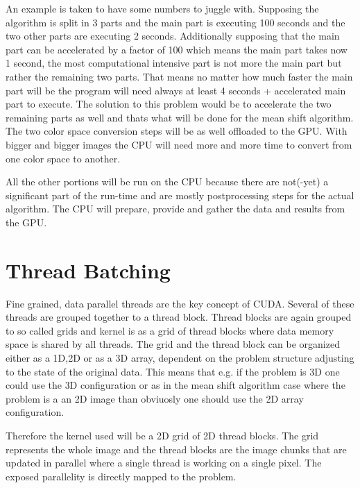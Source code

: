 An example is taken to have some numbers to juggle with. Supposing the algorithm
is split in 3 parts and the main part is executing 100 seconds and the two other
parts are executing 2 seconds. Additionally supposing that the main part can be
accelerated by a factor of 100 which means the main part takes now 1 second, the
most computational intensive part is not more the main part but rather the
remaining two parts. That means no matter how much faster the main part will be
the program will need always at least 4 seconds + accelerated main part to
execute. The solution to this problem would be to accelerate the two remaining
parts as well and thats what will be done for the mean shift algorithm. The two
color space conversion steps will be as well offloaded to the \gls{GPU}. With
bigger and bigger images the \gls{CPU} will need more and more time to convert
from one color space to another. 


All the other portions will be run on the \gls{CPU} because there are not(-yet) a
significant part of the run-time and are mostly postprocessing steps for the actual
algorithm. The \gls{CPU} will prepare, provide and gather the data and results
from the \gls{GPU}. 

\section{Thread Batching} %
\label{sec:cuda_thread_hierarchy}

Fine grained, data parallel threads are the key concept of \gls{CUDA}. Several
of these threads are grouped together to a thread block. Thread blocks are again
grouped to so called grids and kernel is as a grid of thread blocks where data 
memory space is shared by all threads. The grid and the thread block can be 
organized either as a \gls{1D},\gls{2D} or as a \gls{3D} array, dependent on 
the problem structure adjusting to the state of the original data. This means 
that e.g. if the problem is \gls{3D} one could use the \gls{3D} configuration or
as in the mean shift algorithm case where the problem is a an \gls{2D} image than
obviuosly one should use the \gls{2D} array configuration.

Therefore the kernel used will be a \gls{2D} grid of \gls{2D} thread blocks. The
grid represents the whole image and the thread blocks are the image chunks that
are updated in parallel where a single thread is working on a single pixel. The 
exposed parallelity is directly mapped to the problem.  

